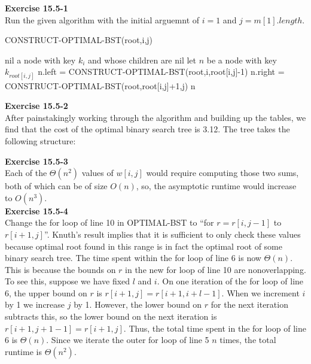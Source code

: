 \documentclass{article}
\begin{document}
\noindent\textbf{Exercise 15.5-1}\\

Run the given algorithm with the initial arguemnt of $i=1$ and $j= m[1].length$.

\begin{algorithm}
\caption{CONSTRUCT-OPTIMAL-BST(root,i,j)}
\begin{algorithmic}
\State \Return nil
\EndIf
{}
\State \Return a node with key $k_i$ and whose children are nil
\EndIf
\State let $n$ be a node with key $k_{root[i,j]}$
\State n.left = CONSTRUCT-OPTIMAL-BST(root,i,root[i,j]-1)
\State n.right = CONSTRUCT-OPTIMAL-BST(root,root[i,j]+1,j)
\State \Return n
\end{algorithmic}
\end{algorithm}

\noindent\textbf{Exercise 15.5-2}\\

After painstakingly working through the algorithm and building up the tables, we find that the cost of the optimal binary search tree is 3.12.  The tree takes the following structure:


\noindent\textbf{Exercise 15.5-3}\\

Each of the $\Theta(n^2)$ values of $w[i,j]$ would require computing those two sums, both of which can be of size $O(n)$, so, the asymptotic runtime would increase to $O(n^3)$.\\

\noindent\textbf{Exercise 15.5-4}\\

Change the for loop of line 10 in OPTIMAL-BST to ``for $r = r[i,j-1]$ to $r[i+1,j]$''.  Knuth's result implies that it is sufficient to only check these values because optimal root found in this range is in fact the optimal root of some binary search tree.  The time spent within the for loop of line 6 is now $\Theta(n)$.  This is because the bounds on $r$ in the new for loop of line 10 are nonoverlapping.  To see this, suppose we have fixed $l$ and $i$.  On one iteration of the for loop of line 6, the upper bound on $r$ is $r[i+1,j] = r[i+1,i+l-1]$.  When we increment $i$ by 1 we increase $j$ by 1.  However, the lower bound on $r$ for the next iteration subtracts this, so the lower bound on the next iteration is $r[i+1,j+1-1] = r[i+1,j]$.  Thus, the total time spent in the for loop of line 6 is $\Theta(n)$.  Since we iterate the outer for loop of line 5 $n$ times, the total runtime is $\Theta(n^2)$.\\
\end{document}
